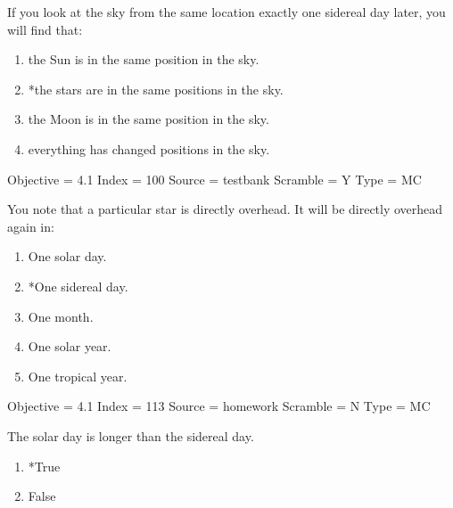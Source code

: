 \documentclass[11pt]{article}
\begin{document}
\begin{enumerate}
\begin{minipage}{\textwidth}
\begin{minipage}{\textwidth}
\item If you look at the sky from the same location exactly one sidereal day later, you will find that:
\begin{enumerate} 
\setlength{\itemsep}{1pt} 
\setlength{\parskip}{0pt} 
\setlength{\parsep}{0pt}
\setlength{\multicolsep}{1pt} 
\item the Sun is in the same position in the sky.
\item *the stars are in the same positions in the sky.
\item the Moon is in the same position in the sky.
\item everything has changed positions in the sky.
\end{enumerate} 
Objective = 4.1
Index = 100
Source = testbank
Scramble = Y
Type = MC
\end{minipage}
\end{minipage}
\vskip 0.20in

\begin{minipage}{\textwidth}
\begin{minipage}{\textwidth}
\item You note that a particular star is directly overhead. It will be directly overhead again in:
\begin{multicols}{3}
\begin{enumerate} 
\setlength{\itemsep}{1pt} 
\setlength{\parskip}{0pt} 
\setlength{\parsep}{0pt}
\setlength{\multicolsep}{1pt} 
\item One solar day.
\item *One sidereal day.
\item One month.
\item One solar year.
\item One tropical year.
\end{enumerate} 
\vfill 
\end{multicols}

Objective = 4.1
Index = 113
Source = homework
Scramble = N
Type = MC
\end{minipage}
\end{minipage}
\vskip 0.20in

\begin{minipage}{\textwidth}
\begin{minipage}{\textwidth}
\item The solar day is longer than the sidereal day.
\begin{multicols}{3}
\begin{enumerate} 
\setlength{\itemsep}{1pt} 
\setlength{\parskip}{0pt} 
\setlength{\parsep}{0pt}
\setlength{\multicolsep}{1pt} 
\item *True
\item False
\end{enumerate} 
\vfill 
\end{multicols}


\end{minipage}
\end{minipage}
\end{enumerate}
\end{document}

